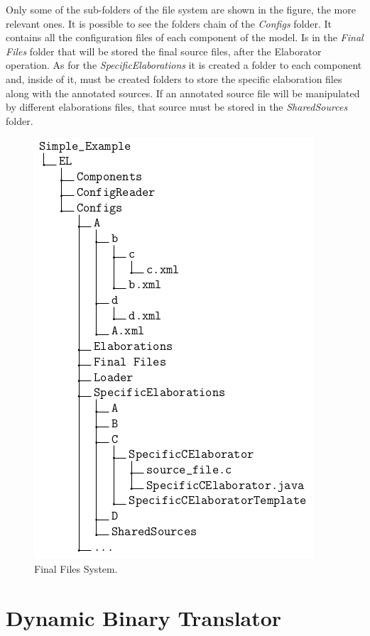 \documentclass[12pt]{article}
\begin{document}
{Only some of the sub-folders of the file system are shown in the figure, the more relevant ones. It is possible to see the folders chain of the \textit{Configs} folder. It contains all the configuration files of each component of the model. Is in the \textit{Final Files} folder that will be stored the final source files, after the Elaborator operation. As for the \textit{SpecificElaborations} it is created a folder to each component and, inside of it, must be created folders to store the specific elaboration files along with the annotated sources. If an annotated source file will be manipulated by different elaborations files, that source must be stored in the \textit{SharedSources} folder.

\begin{figure}[H]
\centering
\includegraphics[scale=0.6]{images/files_system}
\caption{Final Files System.}
\label{fig:file_system} 
\end{figure}



\newpage
\section{Dynamic Binary Translator}

}
\end{document}
